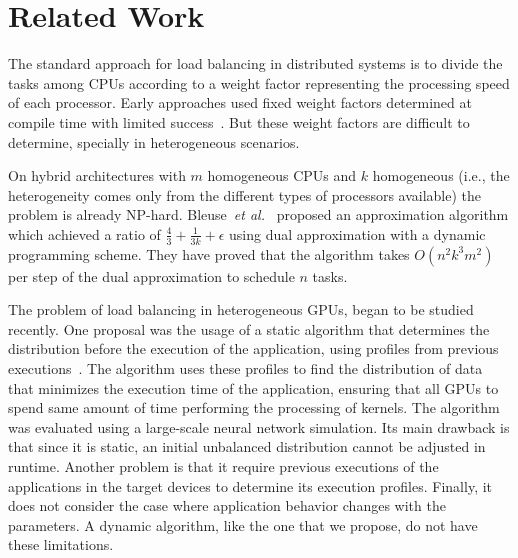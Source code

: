 \documentclass[journal]{IEEEtran}
\begin{document}

\section{Related Work}

The standard approach for load balancing in distributed systems is to divide the
tasks among CPUs according to a weight factor representing the processing speed
of each processor. Early approaches used fixed weight factors determined at
compile time with limited success~\cite{Hummel}. But these weight factors are
difficult to determine, specially in heterogeneous scenarios.

On hybrid architectures with $m$ homogeneous CPUs and $k$ homogeneous
(i.e., the heterogeneity comes only from the different types of
processors available) the problem is already
NP-hard. Bleuse~\textit{et al.}~\cite{bleuse2014scheduling} proposed
an approximation algorithm which achieved a ratio of $\frac{4}{3} +
\frac{1}{3k} + \epsilon$ using dual approximation with a dynamic
programming scheme. They have proved that the algorithm takes
$O(n^2k^3m^2)$ per step of the dual approximation to schedule $n$
tasks.

The problem of load balancing in heterogeneous GPUs, began to be studied
recently. One proposal was the usage of a static algorithm that determines the
distribution before the execution of the application, using profiles from
previous executions~\cite{raphael}. The algorithm uses these profiles to find
the distribution of data that minimizes the execution time of the application,
ensuring that all GPUs to spend same amount of time performing the processing of
kernels. The algorithm was evaluated using a large-scale neural network
simulation. Its main drawback is that since it is static, an initial unbalanced
distribution cannot be adjusted in runtime. Another problem is that it require
previous executions of the applications in the target devices to determine its
execution profiles. Finally, it does not consider the case where application
behavior changes with the parameters. A dynamic algorithm, like the one that we
propose, do not have these limitations.
\end{document}
